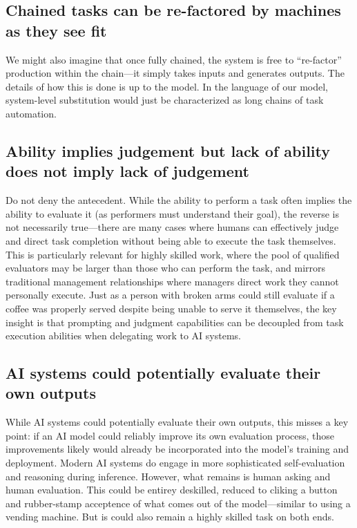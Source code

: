 \documentclass{article}
\begin{document}
\subsection{Chained tasks can be re-factored by machines as they see fit}
We might also imagine that once fully chained, the system is free to ``re-factor'' production within the chain---it simply takes inputs and generates outputs.
The details of how this is done is up to the model. 
In the language of our model, system-level substitution would just be characterized as long chains of task automation.


\subsection{Ability implies judgement but lack of ability does not imply lack of judgement}
Do not deny the antecedent.
While the ability to perform a task often implies the ability to evaluate it (as performers must understand their goal), the reverse is not necessarily true---there are many cases where humans can effectively judge and direct task completion without being able to execute the task themselves. 
This is particularly relevant for highly skilled work, where the pool of qualified evaluators may be larger than those who can perform the task, and mirrors traditional management relationships where managers direct work they cannot personally execute. 
Just as a person with broken arms could still evaluate if a coffee was properly served despite being unable to serve it themselves, the key insight is that prompting and judgment capabilities can be decoupled from task execution abilities when delegating work to AI systems.

\subsection{AI systems could potentially evaluate their own outputs}
While AI systems could potentially evaluate their own outputs, this misses a key point: if an AI model could reliably improve its own evaluation process, those improvements likely would already be incorporated into the model's training and deployment.
Modern AI systems do engage in more sophisticated self-evaluation and reasoning during inference. 
However, what remains is human asking and human evaluation.
This could be entirey deskilled, reduced to cliking a button and rubber-stamp acceptence of what comes out of the model---similar to using a vending machine.
But is could also remain a highly skilled task on both ends.
\end{document}
